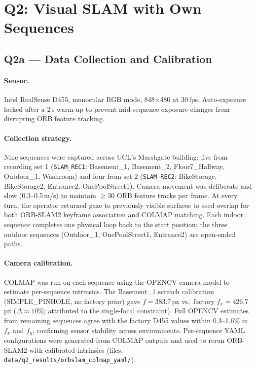 \documentclass[10pt,twocolumn]{article}
\begin{document}
\section{Q2: Visual SLAM with Own Sequences}

\subsection{Q2a — Data Collection and Calibration}

\paragraph{Sensor.}
Intel RealSense D455, monocular RGB mode, 848$\times$480 at 30\,fps.
Auto-exposure locked after a 2\,s warm-up to prevent mid-sequence exposure
changes from disrupting ORB feature tracking.

\paragraph{Collection strategy.}
Nine sequences were captured across UCL's Marshgate building:
five from recording set 1 (\texttt{SLAM\_REC1}: Basement\_1, Basement\_2,
Floor7\_Hallway, Outdoor\_1, Washroom) and four from set 2
(\texttt{SLAM\_REC2}: BikeStorage, BikeStorage2, Entrance2, OnePoolStreet1).
Camera movement was deliberate and slow (0.3--0.5\,m/s) to maintain
$\geq$30 ORB feature tracks per frame.  At every turn, the operator returned
gaze to previously visible surfaces to seed overlap for both ORB-SLAM2
keyframe association and COLMAP matching.  Each indoor sequence completes one
physical loop back to the start position; the three outdoor sequences
(Outdoor\_1, OnePoolStreet1, Entrance2) are open-ended paths.

\paragraph{Camera calibration.}
COLMAP was run on each sequence using the OPENCV camera model to estimate
per-sequence intrinsics.  The Basement\_1 scratch calibration
(SIMPLE\_PINHOLE, no factory prior) gave $f=383.7$\,px vs.\ factory
$f_x = 426.7$\,px ($\Delta \approx 10\%$; attributed to the single-focal
constraint).  Full OPENCV estimates from remaining sequences agree with the
factory D455 values within 0.3--1.6\% in $f_x$ and $f_y$, confirming sensor
stability across environments.  Per-sequence YAML configurations were
generated from COLMAP outputs and used to rerun ORB-SLAM2 with calibrated
intrinsics (files: \texttt{data/q2\_results/orbslam\_colmap\_yaml/}).
\end{document}

